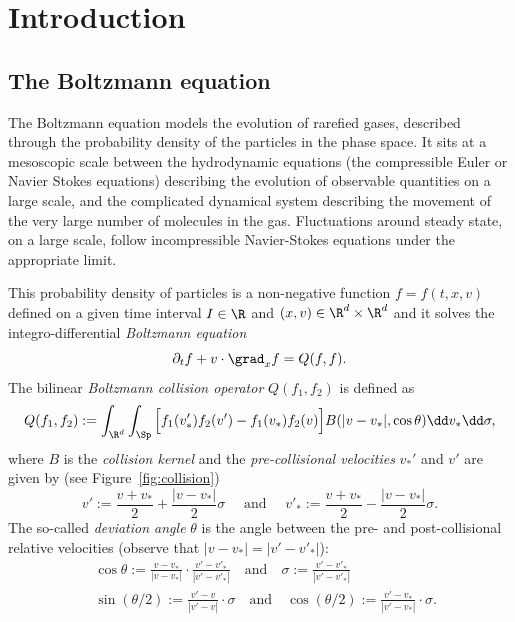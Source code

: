 \section{Introduction}

\subsection{The Boltzmann equation}

The Boltzmann equation models the evolution of rarefied gases,
described through the probability density of the particles in the
phase space. It sits at a mesoscopic scale between the hydrodynamic
equations (\eg the compressible Euler or Navier Stokes equations)
describing the evolution of observable quantities on a large scale,
and the complicated dynamical system describing the movement of the
very large number of molecules in the gas. Fluctuations around steady
state, on a large scale, follow incompressible Navier-Stokes equations
under the appropriate limit.

This probability density of particles is a non-negative function
$f=f(t,x,v)$ defined on a given time interval $I \in \R$ and
$(x,v) \in \R^d \times \R^d$ and it solves the integro-differential
\emph{Boltzmann equation}
\begin{equation}\label{eq:boltzmann}
\partial_t f + v \cdot \grad_x f = Q (f,f).
\end{equation}
The bilinear \emph{Boltzmann collision operator} $Q(f_1,f_2)$ is defined
as
\begin{equation*}
Q (f_1,f_2) := \int_{\R^d} \int_{\Sp} \Big[ f_1(v'_*)f_2(v') - f_1(v_*)f_2(v)
\Big] B(|v-v_*|,\cos \theta) \dd v_* \dd \sigma,
\end{equation*}
where $B$ is the \emph{collision kernel} and the \emph{pre-collisional
velocities} $v_*'$ and $v'$ are given by (see
Figure~\ref{fig:collision})
\[ v' := \frac{v+v_*}2 + \frac{|v-v_*|}2 \sigma \quad \text{ and }
\quad v'_* := \frac{v+v_*}2 - \frac{|v-v_*|}2 \sigma. \] The
so-called \emph{deviation angle} $\theta$ is the angle between the
pre- and post-collisional relative velocities (observe that
$|v-v_*|=|v'-v'_*|$):
\begin{align*}
& \cos \theta := \frac{v-v_*}{|v-v_*|} \cdot
\frac{v'-v'_*}{|v'-v'_*|} \quad \mbox{and} \quad \sigma :=
\frac{v'-v'_*}{|v'-v'_*|} \\
&\sin (\theta/2) := \frac{v'-v}{|v'-v|} \cdot \sigma \quad \mbox{and} \quad
\cos (\theta/2) := \frac{v'-v_*}{|v'-v_*|} \cdot \sigma .
\end{align*}

